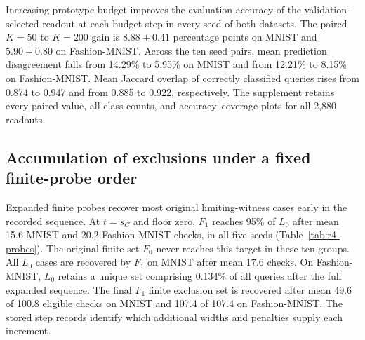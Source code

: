 

Increasing prototype budget improves the evaluation accuracy of the validation-selected readout at each budget step in every seed of both datasets. The paired $K=50$ to $K=200$ gain is $8.88\pm0.41$ percentage points on MNIST and $5.90\pm0.80$ on Fashion-MNIST. Across the ten seed pairs, mean prediction disagreement falls from 14.29\% to 5.95\% on MNIST and from 12.21\% to 8.15\% on Fashion-MNIST. Mean Jaccard overlap of correctly classified queries rises from 0.874 to 0.947 and from 0.885 to 0.922, respectively. The supplement retains every paired value, all class counts, and accuracy--coverage plots for all 2,880 readouts.

\subsection{Accumulation of exclusions under a fixed finite-probe order}
\label{sec:r4-probe-results}
Expanded finite probes recover most original limiting-witness cases early in the recorded sequence. At $t=s_C$ and floor zero, $F_1$ reaches 95\% of $L_0$ after mean 15.6 MNIST and 20.2 Fashion-MNIST checks, in all five seeds (Table~\ref{tab:r4-probes}). The original finite set $F_0$ never reaches this target in these ten groups. All $L_0$ cases are recovered by $F_1$ on MNIST after mean 17.6 checks. On Fashion-MNIST, $L_0$ retains a unique set comprising 0.134\% of all queries after the full expanded sequence. The final $F_1$ finite exclusion set is recovered after mean 49.6 of 100.8 eligible checks on MNIST and 107.4 of 107.4 on Fashion-MNIST. The stored step records identify which additional widths and penalties supply each increment.


